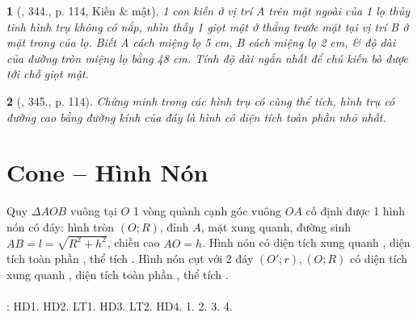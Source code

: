 \documentclass{article}
\newtheorem{baitoan}{}
\begin{document}
\begin{baitoan}[\cite{Binh_Toan_9_tap_2}, 344., p. 114, Kiến \& mật]
	1 con kiến ở vị trí A trên mặt ngoài của 1 lọ thủy tinh hình trụ không có nắp, nhìn thấy 1 giọt mật ở thẳng trước mặt tại vị trí B ở mặt trong của lọ. Biết A cách miệng lọ {\rm5 cm}, B cách miệng lọ {\rm2 cm}, \& độ dài của đường tròn miệng lọ bằng {\rm48 cm}. Tính độ dài ngắn nhất để chú kiến bò được tới chỗ giọt mật.
\end{baitoan}

\begin{baitoan}[\cite{Binh_Toan_9_tap_2}, 345., p. 114]
	Chứng minh trong các hình trụ có cùng thể tích, hình trụ có đường cao bằng đường kính của đáy là hình có diện tích toàn phần nhỏ nhất.
\end{baitoan}


\section{Cone -- Hình Nón}
\begin{center}
\end{center}
 Quy $\Delta AOB$ vuông tại $O$ 1 vòng quành cạnh góc vuông $OA$ cố định được 1 hình nón có đáy: hình tròn $(O;R)$, đỉnh $A$, mặt xung quanh, đường sinh $AB = l = \sqrt{R^2 + h^2}$, chiều cao $AO = h$.  Hình nón có diện tích xung quanh , diện tích toàn phần , thể tích .  Hình nón cụt với 2 đáy $(O';r),(O;R)$ có diện tích xung quanh , diện tích toàn phần , thể tích .\\
\\
\cite[Chap. X, \S2, pp. 98--103]{SGK_Toan_9_Canh_Dieu_tap_1}: HD1. HD2. LT1. HD3. LT2. HD4. 1. 2. 3. 4.
\end{document}
